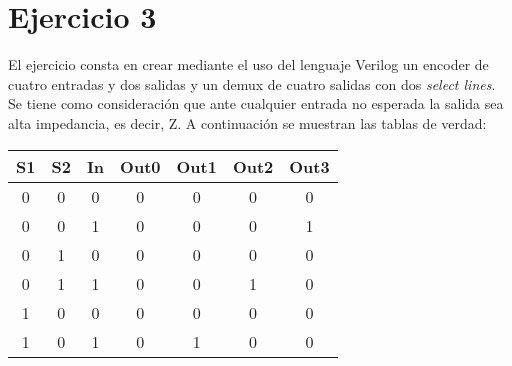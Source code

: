\newpage
\section{Ejercicio 3}
\noindent
El ejercicio consta en crear mediante el uso del lenguaje Verilog un encoder de cuatro entradas y dos salidas y un demux de cuatro salidas con dos \textit{select lines}.\newline
Se tiene como consideración que ante cualquier entrada no esperada la salida sea alta impedancia, es decir, Z.\newline
A continuaci\'on se muestran las tablas de verdad:

\begin{table}[H]
    \center
    \begin{tabular}{|ccc|cccc|}
    \hline
    \textbf{S1} & \textbf{S2} & \textbf{In} & \textbf{Out0} & \textbf{Out1} & \textbf{Out2} & \textbf{Out3} \\ \hline
    \cellcolor[HTML]{34FF34}0           & \cellcolor[HTML]{34FF34}0           & \cellcolor[HTML]{34FF34}0           & \cellcolor[HTML]{FD6864}0             & \cellcolor[HTML]{FD6864}0             & \cellcolor[HTML]{FD6864}0             & \cellcolor[HTML]{FD6864}0             \\
    \cellcolor[HTML]{34FF34}0           & \cellcolor[HTML]{34FF34}0           & \cellcolor[HTML]{34FF34}1           & \cellcolor[HTML]{FD6864}0             & \cellcolor[HTML]{FD6864}0             & \cellcolor[HTML]{FD6864}0             & \cellcolor[HTML]{FD6864}1             \\
    \cellcolor[HTML]{34FF34}0           & \cellcolor[HTML]{34FF34}1           & \cellcolor[HTML]{34FF34}0           & \cellcolor[HTML]{FD6864}0             & \cellcolor[HTML]{FD6864}0             & \cellcolor[HTML]{FD6864}0             & \cellcolor[HTML]{FD6864}0             \\
    \cellcolor[HTML]{34FF34}0           & \cellcolor[HTML]{34FF34}1           & \cellcolor[HTML]{34FF34}1           & \cellcolor[HTML]{FD6864}0             & \cellcolor[HTML]{FD6864}0             & \cellcolor[HTML]{FD6864}1             & \cellcolor[HTML]{FD6864}0             \\
    \cellcolor[HTML]{34FF34}1           & \cellcolor[HTML]{34FF34}0           & \cellcolor[HTML]{34FF34}0           & \cellcolor[HTML]{FD6864}0             & \cellcolor[HTML]{FD6864}0             & \cellcolor[HTML]{FD6864}0             & \cellcolor[HTML]{FD6864}0             \\
    \cellcolor[HTML]{34FF34}1           & \cellcolor[HTML]{34FF34}0           & \cellcolor[HTML]{34FF34}1           & \cellcolor[HTML]{FD6864}0             & \cellcolor[HTML]{FD6864}1             & \cellcolor[HTML]{FD6864}0             & \cellcolor[HTML]{FD6864}0             \\

\end{tabular}
\end{table}
